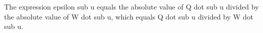 The expression epsilon sub u equals the absolute value of Q dot sub u divided by the absolute value of W dot sub u, which equals Q dot sub u divided by W dot sub u.